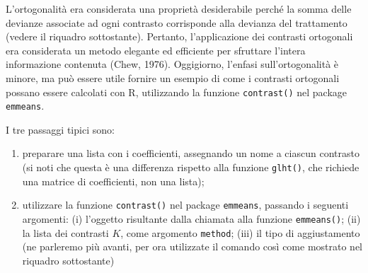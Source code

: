 \documentclass[
  12pt,
]{book}
\providecommand{\tightlist}{%
  \setlength{\itemsep}{0pt}\setlength{\parskip}{0pt}}
\begin{document}
L'ortogonalità era considerata una proprietà desiderabile perché la somma delle devianze associate ad ogni contrasto corrisponde alla devianza del trattamento (vedere il riquadro sottostante). Pertanto, l'applicazione dei contrasti ortogonali era considerata un metodo elegante ed efficiente per sfruttare l'intera informazione contenuta (Chew, 1976). Oggigiorno, l'enfasi sull'ortogonalità è minore, ma può essere utile fornire un esempio di come i contrasti ortogonali possano essere calcolati con R, utilizzando la funzione \texttt{contrast()} nel package \texttt{emmeans}.

I tre passaggi tipici sono:

\begin{enumerate}
\def\labelenumi{\arabic{enumi}.}
\tightlist
\item
  preparare una lista con i coefficienti, assegnando un nome a ciascun contrasto (si noti che questa è una differenza rispetto alla funzione \texttt{glht()}, che richiede una matrice di coefficienti, non una lista);
\item
  utilizzare la funzione \texttt{contrast()} nel package \texttt{emmeans}, passando i seguenti argomenti: (i) l'oggetto risultante dalla chiamata alla funzione \texttt{emmeans()}; (ii) la lista dei contrasti \(K\), come argomento \texttt{method}; (iii) il tipo di aggiustamento (ne parleremo più avanti, per ora utilizzate il comando così come mostrato nel riquadro sottostante)
\end{enumerate}
\end{document}
